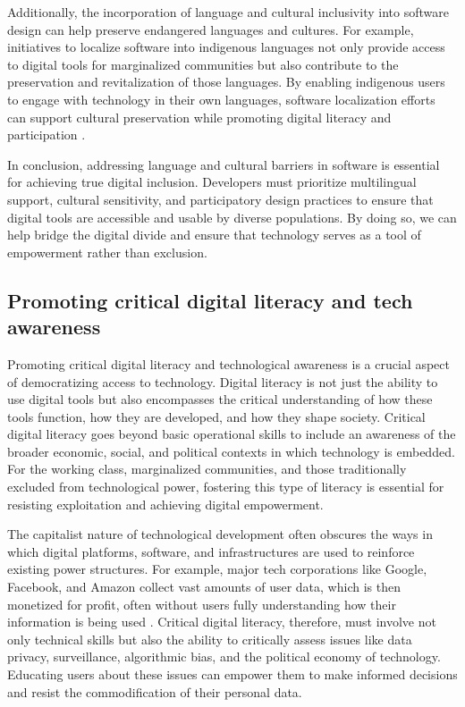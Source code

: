 \begin{refsection}
Additionally, the incorporation of language and cultural inclusivity into software design can help preserve endangered languages and cultures. For example, initiatives to localize software into indigenous languages not only provide access to digital tools for marginalized communities but also contribute to the preservation and revitalization of those languages. By enabling indigenous users to engage with technology in their own languages, software localization efforts can support cultural preservation while promoting digital literacy and participation \cite[pp.~120-123]{fuchscriticalcommunication}.

In conclusion, addressing language and cultural barriers in software is essential for achieving true digital inclusion. Developers must prioritize multilingual support, cultural sensitivity, and participatory design practices to ensure that digital tools are accessible and usable by diverse populations. By doing so, we can help bridge the digital divide and ensure that technology serves as a tool of empowerment rather than exclusion.

\subsection{Promoting critical digital literacy and tech awareness}

Promoting critical digital literacy and technological awareness is a crucial aspect of democratizing access to technology. Digital literacy is not just the ability to use digital tools but also encompasses the critical understanding of how these tools function, how they are developed, and how they shape society. Critical digital literacy goes beyond basic operational skills to include an awareness of the broader economic, social, and political contexts in which technology is embedded. For the working class, marginalized communities, and those traditionally excluded from technological power, fostering this type of literacy is essential for resisting exploitation and achieving digital empowerment.

The capitalist nature of technological development often obscures the ways in which digital platforms, software, and infrastructures are used to reinforce existing power structures. For example, major tech corporations like Google, Facebook, and Amazon collect vast amounts of user data, which is then monetized for profit, often without users fully understanding how their information is being used \cite[pp.~88-90]{fuchs2016digital}. Critical digital literacy, therefore, must involve not only technical skills but also the ability to critically assess issues like data privacy, surveillance, algorithmic bias, and the political economy of technology. Educating users about these issues can empower them to make informed decisions and resist the commodification of their personal data.


\end{refsection}
